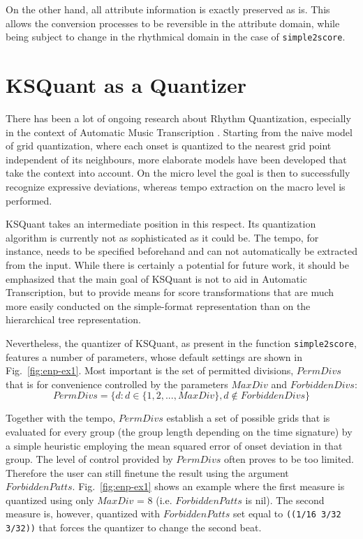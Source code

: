 \documentclass[runningheads,a4paper]{llncs}
\begin{document}
On the other hand, all attribute information is exactly preserved as
is. This allows the conversion processes to be reversible in the
attribute domain, while being subject to change in the rhythmical
domain in the case of \texttt{simple2score}.

\section{KSQuant  as a Quantizer}\label{KSQuant Quantitizer}
There has been a lot of ongoing research about Rhythm Quantization,
especially in the context of Automatic Music Transcription
\cite{agon}.  Starting from the naive model of grid
quantization, where each onset is quantized to the nearest grid point
independent of its neighbours, more elaborate models have been
developed that take the context into account. On the micro level the
goal is then to successfully recognize expressive deviations, whereas
tempo extraction on the macro level is performed.

KSQuant takes an intermediate position in this respect. Its
quantization algorithm is currently not as sophisticated as it could
be. The tempo, for instance, needs to be specified beforehand and can
not automatically be extracted from the input.  While there is
certainly a potential for future work, it should be emphasized that
the main goal of KSQuant is not to aid in Automatic Transcription, but
to provide means for score transformations that are much more easily
conducted on the simple-format representation than on the hierarchical
tree representation.

Nevertheless, the quantizer of KSQuant, as present in the function
\texttt{simple2score}, features a number of parameters, whose default
settings are shown in Fig.~\ref{fig:enp-ex1}.  Most important
is the set of permitted divisions, $PermDivs$ that is for convenience
controlled by the parameters $MaxDiv$ and $ForbiddenDivs$:
$$PermDivs = \{d:d \in \{1,2, ..., MaxDiv \}, d \notin ForbiddenDivs\}$$

Together with the tempo, $PermDivs$ establish a set of possible grids
that is evaluated for every group (the group length depending on the
time signature) by a simple heuristic employing the mean squared error
of onset deviation in that group.  The level of control provided by
$PermDivs$ often proves to be too limited. Therefore the user can
still finetune the result using the argument
$ForbiddenPatts$. Fig.~\ref{fig:enp-ex1} shows an example where the first
measure is quantized using only $MaxDiv$ = 8 (i.e. $ForbiddenPatts$ is
nil). The second measure is, however, quantized with $ForbiddenPatts$
set equal to \texttt{((1/16 3/32 3/32))} that forces the quantizer to
change the second beat.
\end{document}
